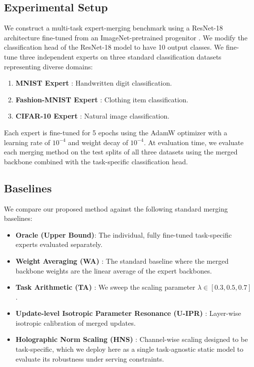 \documentclass{article}
\theoremstyle{plain}
\theoremstyle{definition}
\theoremstyle{remark}
\begin{document}
\subsection{Experimental Setup}
We construct a multi-task expert-merging benchmark using a ResNet-18 architecture \cite{he2016deep} fine-tuned from an ImageNet-pretrained progenitor \cite{deng2009imagenet}.
We modify the classification head of the ResNet-18 model to have 10 output classes.
We fine-tune three independent experts on three standard classification datasets representing diverse domains:
\begin{enumerate}
    \item \textbf{MNIST Expert} \cite{lecun1998gradient}: Handwritten digit classification.
    \item \textbf{Fashion-MNIST Expert} \cite{xiao2017fashion}: Clothing item classification.
    \item \textbf{CIFAR-10 Expert} \cite{krizhevsky2009learning}: Natural image classification.
\end{enumerate}
Each expert is fine-tuned for 5 epochs using the AdamW optimizer \cite{kingma2014adam} with a learning rate of $10^{-4}$ and weight decay of $10^{-4}$.
At evaluation time, we evaluate each merging method on the test splits of all three datasets using the merged backbone combined with the task-specific classification head.

\subsection{Baselines}
We compare our proposed method against the following standard merging baselines:
\begin{itemize}
    \item \textbf{Oracle (Upper Bound)}: The individual, fully fine-tuned task-specific experts evaluated separately.
    \item \textbf{Weight Averaging (WA)} \cite{mcmahan2017communication}: The standard baseline where the merged backbone weights are the linear average of the expert backbones.
    \item \textbf{Task Arithmetic (TA)} \cite{ilharco2022editing}: We sweep the scaling parameter $\lambda \in [0.3, 0.5, 0.7]$.
    \item \textbf{Update-level Isotropic Parameter Resonance (U-IPR)} \cite{submission9_reference}: Layer-wise isotropic calibration of merged updates.
    \item \textbf{Holographic Norm Scaling (HNS)} \cite{submission7_reference}: Channel-wise scaling designed to be task-specific, which we deploy here as a single task-agnostic static model to evaluate its robustness under serving constraints.
\end{itemize}
\end{document}

